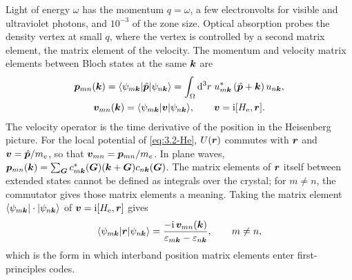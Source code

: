 Light of energy $\omega$ has the momentum $q = \omega$, a few electronvolts for visible and ultraviolet photons, and $10^{-3}$ of the zone size. Optical absorption probes the density vertex at small $q$, where the vertex is controlled by a second matrix element, the matrix element of the velocity. The momentum and velocity matrix elements between Bloch states at the same $\bm{k}$ are
\begin{equation}
  \begin{gathered}
  \bm{p}_{mn}(\bm{k}) = \langle\psi_{m\bm{k}}|\hat{\bm{p}}|\psi_{n\bm{k}}\rangle = \int_\Omega\mathrm{d}^3r\;u^*_{m\bm{k}}\,(\hat{\bm{p}} + \bm{k})\,u_{n\bm{k}}, \\
  \bm{v}_{mn}(\bm{k}) = \langle\psi_{m\bm{k}}|\bm{v}|\psi_{n\bm{k}}\rangle, \qquad
  \bm{v} = \mathrm{i}[H_{\mathrm{e}},\bm{r}] .
  \end{gathered}
  \label{eq:3.2-pv}
\end{equation}
The velocity operator is the time derivative of the position in the Heisenberg picture. For the local potential of \cref{eq:3.2-He}, $U(\bm{r})$ commutes with $\bm{r}$ and $\bm{v} = \hat{\bm{p}}/m_e$, so that $\bm{v}_{mn} = \bm{p}_{mn}/m_e$. In plane waves, $\bm{p}_{mn}(\bm{k}) = \sum_{\bm{G}}c^*_{m\bm{k}}(\bm{G})(\bm{k} + \bm{G})c_{n\bm{k}}(\bm{G})$. The matrix elements of $\bm{r}$ itself between extended states cannot be defined as integrals over the crystal; for $m \ne n$, the commutator gives those matrix elements a meaning. Taking the matrix element $\langle\psi_{m\bm{k}}|\cdot|\psi_{n\bm{k}}\rangle$ of $\bm{v} = \mathrm{i}[H_{\mathrm{e}},\bm{r}]$ gives
\begin{equation}
  \langle\psi_{m\bm{k}}|\bm{r}|\psi_{n\bm{k}}\rangle = \frac{-\mathrm{i}\,\bm{v}_{mn}(\bm{k})}{\varepsilon_{m\bm{k}} - \varepsilon_{n\bm{k}}}, \qquad m \ne n ,
  \label{eq:3.2-r}
\end{equation}
which is the form in which interband position matrix elements enter first-principles codes.

